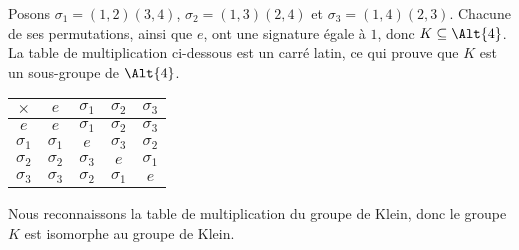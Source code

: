 Posons $\sigma_1 = (1,2)(3,4)$, $\sigma_2 = (1,3)(2,4)$ et $\sigma_3 = (1,4)(2,3)$.
Chacune de ses permutations, ainsi que $e$, ont une signature égale à $1$, donc
$K\subseteq \Alt{4}$.
La table de multiplication ci-dessous est un carré latin, ce qui prouve que $K$
est un sous-groupe de $\Alt{4}$.

\begin{center}
  \begin{tabular}{c|cccc}
        $\times$ &        $e$ & $\sigma_1$ & $\sigma_2$ & $\sigma_3$ \\
      \midrule
             $e$ &        $e$ & $\sigma_1$ & $\sigma_2$ & $\sigma_3$ \\
      $\sigma_1$ & $\sigma_1$ &        $e$ & $\sigma_3$ & $\sigma_2$ \\
      $\sigma_2$ & $\sigma_2$ & $\sigma_3$ &        $e$ & $\sigma_1$ \\
      $\sigma_3$ & $\sigma_3$ & $\sigma_2$ & $\sigma_1$ &        $e$
  \end{tabular}
\end{center}

Nous reconnaissons la table de multiplication du groupe de Klein, donc le groupe $K$ est isomorphe au groupe de Klein.
